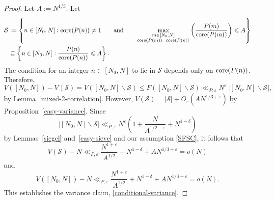 \documentclass[reqno, 12pt]{amsart}
\theoremstyle{plain}
\theoremstyle{definition}
\theoremstyle{remark}
\renewcommand{\le}{\leqslant}
\newcommand{\co}{\textnormal{core}}
\begin{document}
\begin{proof}
Let $A := N^{1/3}$.
Let
\begin{equation*}
\begin{split}
\mathcal{S} &:= \left\{n\in [N_0,N]:
\co(P(n)) \ne 1
\qquad \textnormal{and} \qquad
\max_{\substack{m\in [N_0,N] \\ \co(P(m))=\co(P(n))}}
\left(\frac{P(m)}{\co(P(m))}\right) \le A\right\} \\
&\subseteq \left\{n\in [N_0,N]:
\frac{P(n)}{\co(P(n))} \le A\right\}.
\end{split}
\end{equation*}
The condition for an integer $n\in [N_0,N]$
to lie in $\mathcal{S}$ depends only on $\co(P(n))$.
Therefore,
\begin{equation*}
V([N_0,N]) - V(\mathcal{S})
= V([N_0,N]\smallsetminus \mathcal{S})
\le F([N_0,N]\smallsetminus \mathcal{S})
\ll_{P,\varepsilon} N^{\varepsilon}\, |[N_0,N]\smallsetminus \mathcal{S}|,
\end{equation*}
by Lemma~\ref{mixed-2-correlation}.
However, $V(\mathcal{S}) = |\mathcal{S}| + O_\varepsilon(A N^{1/3+\varepsilon})$
by Proposition~\ref{easy-variance}.
Since $$|[N_0,N]\smallsetminus \mathcal{S}|
\ll_{P,\varepsilon} N^\varepsilon \left(1 + \frac{N}{A^{1/2-\varepsilon}} + N^{1-\delta}\right)$$
by Lemmas~\ref{siegel} and~\ref{easy-sieve}
and our assumption \eqref{SFSC},
it follows that
\begin{equation*}
V(\mathcal{S}) - N
\ll_{P,\varepsilon} \frac{N^{1+\varepsilon}}{A^{1/2}} + N^{1-\delta} + A N^{1/3+\varepsilon}
= o(N)
\end{equation*}
and
\begin{equation*}
V([N_0,N]) - N
\ll_{P,\varepsilon} \frac{N^{1+\varepsilon}}{A^{1/2}} + N^{1-\delta} + A N^{1/3+\varepsilon}
= o(N).
\end{equation*}
This establishes the variance claim, \eqref{conditional-variance}.


\end{proof}
\end{document}
